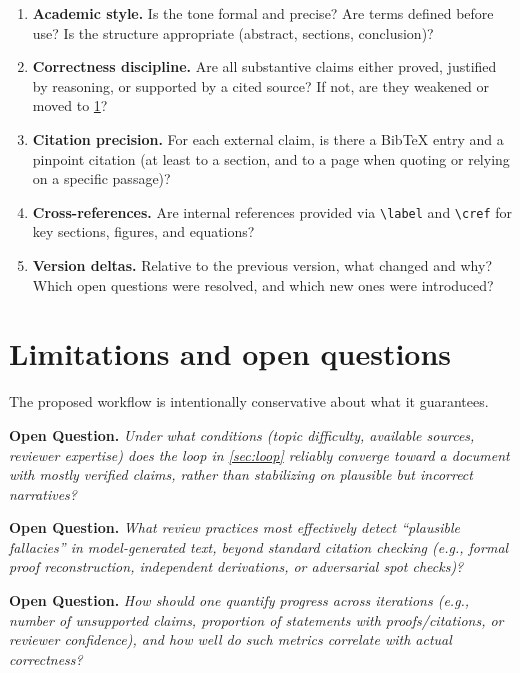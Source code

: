 \documentclass[11pt,a4paper]{article}
\theoremstyle{definition}
\theoremstyle{remark}
\newenvironment{openquestion}{\par\textbf{Open Question.}\itshape}{\par}
\begin{document}
\begin{enumerate}
  \item \textbf{Academic style.} Is the tone formal and precise? Are terms defined before use? Is the structure appropriate (abstract, sections, conclusion)?

  \item \textbf{Correctness discipline.} Are all substantive claims either proved, justified by reasoning, or supported by a cited source? If not, are they weakened or moved to \cref{sec:open-questions}?

  \item \textbf{Citation precision.} For each external claim, is there a Bib\TeX{} entry and a pinpoint citation (at least to a section, and to a page when quoting or relying on a specific passage)?

  \item \textbf{Cross-references.} Are internal references provided via \texttt{\textbackslash label} and \texttt{\textbackslash cref} for key sections, figures, and equations?

  \item \textbf{Version deltas.} Relative to the previous version, what changed and why? Which open questions were resolved, and which new ones were introduced?
\end{enumerate}

\section{Limitations and open questions}
\label{sec:open-questions}

The proposed workflow is intentionally conservative about what it guarantees.

\begin{openquestion}
Under what conditions (topic difficulty, available sources, reviewer expertise) does the loop in \cref{sec:loop} reliably converge toward a document with mostly verified claims, rather than stabilizing on plausible but incorrect narratives?
\end{openquestion}

\begin{openquestion}
What review practices most effectively detect ``plausible fallacies'' in model-generated text, beyond standard citation checking (e.g., formal proof reconstruction, independent derivations, or adversarial spot checks)?
\end{openquestion}

\begin{openquestion}
How should one quantify progress across iterations (e.g., number of unsupported claims, proportion of statements with proofs/citations, or reviewer confidence), and how well do such metrics correlate with actual correctness?
\end{openquestion}
\end{document}
